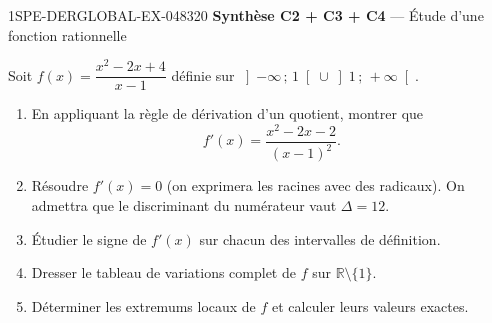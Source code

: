 \begin{exercice}{1SPE-DERGLOBAL-EX-048}{3}{20}
\textbf{Synthèse C2 + C3 + C4} — Étude d'une fonction rationnelle

Soit $f(x) = \dfrac{x^2 - 2x + 4}{x - 1}$ définie sur $\left]-\infty\,;\,1\right[ \cup \left]1\,;\,+\infty\right[$.

\begin{enumerate}
  \item En appliquant la règle de dérivation d'un quotient, montrer que
        \[
          f'(x) = \frac{x^2 - 2x - 2}{(x-1)^2}.
        \]
  \item Résoudre $f'(x) = 0$ (on exprimera les racines avec des radicaux).
        On admettra que le discriminant du numérateur vaut $\Delta = 12$.
  \item Étudier le signe de $f'(x)$ sur chacun des intervalles de définition.
  \item Dresser le tableau de variations complet de $f$ sur $\mathbb{R} \setminus \{1\}$.
  \item Déterminer les extremums locaux de $f$ et calculer leurs valeurs exactes.
\end{enumerate}
\end{exercice}
